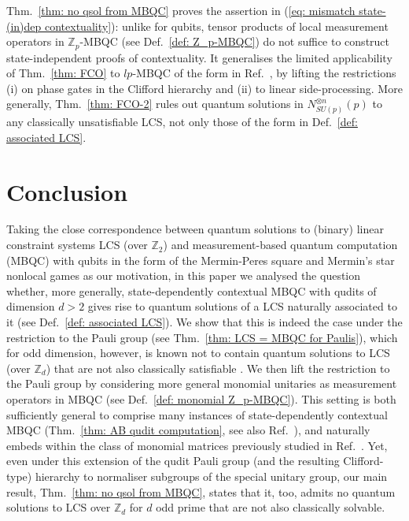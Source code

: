 \documentclass[aps,pra,letterpaper,onrcolumn,nofootinbib,notitlepage,longbibliography]{revtex4-1}
\newcommand{\zz}{\mathbb Z}
\begin{document}
Thm.~\ref{thm: no qsol from MBQC} proves the assertion in (\ref{eq: mismatch state-(in)dep contextuality}): unlike for qubits, tensor products of local measurement operators in $\zz_p$-MBQC (see Def.~\ref{def: Z_p-MBQC}) do not suffice to construct state-independent proofs of contextuality. It generalises the limited applicability of Thm.~\ref{thm: FCO} to $lp$-MBQC of the form in Ref.~\cite{FrembsRobertsCampbellBartlett2022}, by lifting the restrictions (i) on phase gates in the Clifford hierarchy and (ii) to linear side-processing. More generally, Thm.~\ref{thm: FCO-2} rules out quantum solutions in $N^{\otimes n}_{SU(p)}(p)$ to any classically unsatisfiable LCS, not only those of the form in Def.~\ref{def: associated LCS}.



\section{Conclusion}\label{sec: conclusion}

Taking the close correspondence between quantum solutions to (binary) linear constraint systems LCS (over $\zz_2$) and measurement-based quantum computation (MBQC) with qubits in the form of the Mermin-Peres square  \cite{Mermin1990,Peres1991} and Mermin's star \cite{Mermin1993} nonlocal games as our motivation, in this paper we analysed the question whether, more generally, state-dependently contextual MBQC with qudits of dimension $d>2$ gives rise to quantum solutions of a LCS naturally associated to it (see Def.~\ref{def: associated LCS}). We show that this is indeed the case under the restriction to the Pauli group (see Thm.~\ref{thm: LCS = MBQC for Paulis}), which for odd dimension, however, is known not to contain quantum solutions to LCS (over $\zz_d$) that are not also classically satisfiable \cite{QassimWallman2020}. We then lift the restriction to the Pauli group by considering more general monomial unitaries as measurement operators in MBQC (see Def.~\ref{def: monomial Z_p-MBQC}). This setting is both sufficiently general to comprise many instances of state-dependently contextual MBQC (Thm.~\ref{thm: AB qudit computation}, see also Ref.~\cite{FrembsRobertsCampbellBartlett2022}), and naturally embeds within the class of monomial matrices previously studied in Ref.~\cite{VanDenNest2011,vanDenNest2013}. Yet, even under this extension of the qudit Pauli group (and the resulting Clifford-type) hierarchy to normaliser subgroups of the special unitary group, our main result, Thm.~\ref{thm: no qsol from MBQC}, states that it, too, admits no quantum solutions to LCS over $\zz_d$ for $d$ odd prime that are not also classically solvable.
\end{document}
